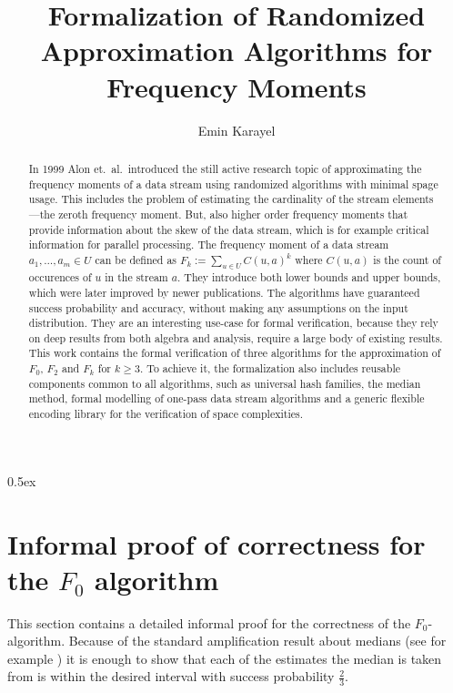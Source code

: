 \documentclass[11pt,a4paper]{article}
\begin{document}
\title{Formalization of Randomized Approximation Algorithms for Frequency Moments}
\author{Emin Karayel}
\maketitle
\begin{abstract}
In 1999 Alon et.\ al.\ introduced the still active research topic of approximating the frequency moments of a data stream using randomized algorithms with minimal spage usage.
This includes the problem of estimating the cardinality of the stream elements---the zeroth frequency moment.
But, also higher order frequency moments that provide information about the skew of the data stream, which is for example critical information for parallel processing.
The frequency moment of a data stream $a_1, \ldots, a_m \in U$ can be defined as $F_k := \sum_{u \in U} C(u,a)^k$ where $C(u,a)$ is the count of occurences of $u$ in the stream $a$.
They introduce both lower bounds and upper bounds, which were later improved by newer publications.
The algorithms have guaranteed success probability and accuracy, without making any assumptions on the input distribution.
They are an interesting use-case for formal verification, because they rely on deep results from both algebra and analysis, require a large body of existing results.
This work contains the formal verification of three algorithms for the approximation of $F_0$, $F_2$ and $F_k$ for $k \geq 3$.
To achieve it, the formalization also includes reusable components common to all algorithms, such as universal hash families, the median method, formal modelling of one-pass data stream algorithms and a generic flexible encoding library for the verification of space complexities.
\end{abstract}

\tableofcontents

\parindent 0pt\parskip 0.5ex


\appendix
\section{Informal proof of correctness for the $F_0$ algorithm\label{sec:f0_proof}}
This section contains a detailed informal proof for the correctness of the $F_0$-algorithm.
Because of the standard amplification result about medians (see for example \cite{alon1999}) it
is enough to show that each of the estimates the median is taken from is within the desired interval
with success probability $\frac{2}{3}$.
\end{document}
